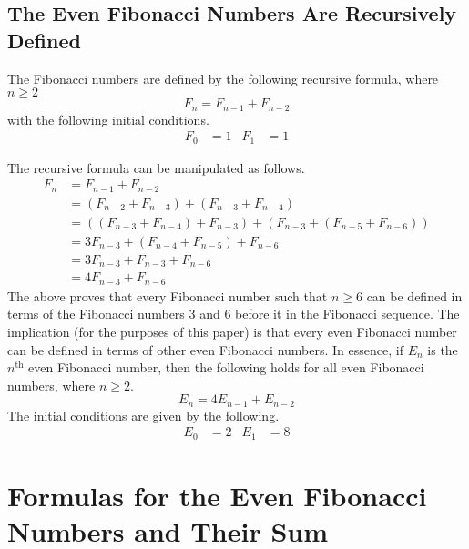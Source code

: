\documentclass[titlepage]{article}
\begin{document}
\subsection{The Even Fibonacci Numbers Are Recursively Defined}\label{sss:evenRecursive}
The Fibonacci numbers are defined by the following recursive formula, where $n\geq 2$
\begin{equation*}
    F_n = F_{n-1}+F_{n-2}
\end{equation*}
with the following initial conditions.
\begin{align*}
    F_0 &= 1&
        F_1 &= 1
\end{align*}\par
The recursive formula can be manipulated as follows.
\begin{align*}
    F_n &= F_{n-1}+F_{n-2}\\
    &= (F_{n-2}+F_{n-3})+(F_{n-3}+F_{n-4})\\
    &= ((F_{n-3}+F_{n-4})+F_{n-3})+(F_{n-3}+(F_{n-5}+F_{n-6}))\\
    &= 3F_{n-3}+(F_{n-4}+F_{n-5})+F_{n-6}\\
    &= 3F_{n-3}+F_{n-3}+F_{n-6}\\
    &= 4F_{n-3}+F_{n-6}
\end{align*}
The above proves that every Fibonacci number such that $n\geq 6$ can be defined in terms of the Fibonacci numbers 3 and 6 before it in the Fibonacci sequence. The implication (for the purposes of this paper) is that every even Fibonacci number can be defined in terms of other even Fibonacci numbers. In essence, if $E_n$ is the $n^\text{th}$ even Fibonacci number, then the following holds for all even Fibonacci numbers, where $n\geq 2$.
\begin{equation*}
    E_n = 4E_{n-1}+E_{n-2}
\end{equation*}
The initial conditions are given by the following.
\begin{align*}
    E_0 &= 2&
        E_1 &= 8
\end{align*}
\newpage



\section{Formulas for the Even Fibonacci Numbers and Their Sum}
\end{document}

